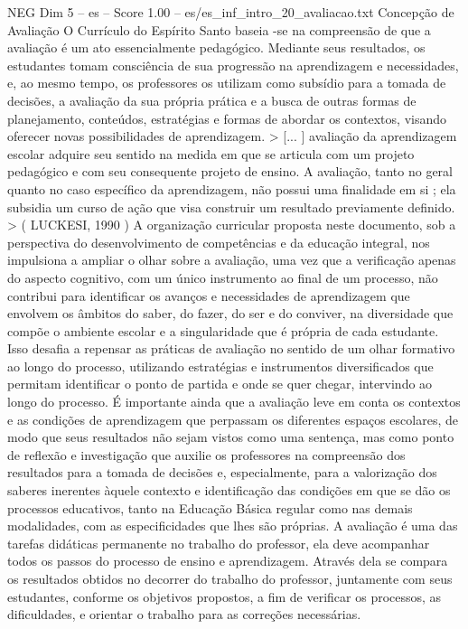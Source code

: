 \begin{textsample}{NEG Dim 5 – es – Score 1.00 – es/es\_inf\_intro\_20\_avaliacao.txt}  \label{ex:f5_neg_188}
Concepção de Avaliação O Currículo do Espírito Santo baseia -se na compreensão de que a avaliação é um ato essencialmente pedagógico.
Mediante seus resultados, os estudantes tomam consciência de sua progressão na aprendizagem e necessidades, e, ao mesmo tempo, os professores os utilizam como subsídio para a tomada de decisões, a avaliação da sua própria prática e a busca de outras formas de planejamento, conteúdos, estratégias e formas de abordar os contextos, visando oferecer novas possibilidades de aprendizagem. > [... ] avaliação da aprendizagem escolar adquire seu sentido na medida em que se articula com um projeto pedagógico e com seu consequente projeto de ensino.
A avaliação, tanto no geral quanto no caso específico da aprendizagem, não possui uma finalidade em si ; ela subsidia um curso de ação que visa construir um resultado previamente definido. > ( LUCKESI, 1990 ) A organização curricular proposta neste documento, sob a perspectiva do desenvolvimento de competências e da educação integral, nos impulsiona a ampliar o olhar sobre a avaliação, uma vez que a verificação apenas do aspecto cognitivo, com um único instrumento ao final de um processo, não contribui para identificar os avanços e necessidades de aprendizagem que envolvem os âmbitos do saber, do fazer, do ser e do conviver, na diversidade que compõe o ambiente escolar e a singularidade que é própria de cada estudante.
Isso desafia a repensar as práticas de avaliação no sentido de um olhar formativo ao longo do processo, utilizando estratégias e instrumentos diversificados que permitam identificar o ponto de partida e onde se quer chegar, intervindo ao longo do processo.
É importante ainda que a avaliação leve em conta os contextos e as condições de aprendizagem que perpassam os diferentes espaços escolares, de modo que seus resultados não sejam vistos como uma sentença, mas como ponto de reflexão e investigação que auxilie os professores na compreensão dos resultados para a tomada de decisões e, especialmente, para a valorização dos saberes inerentes àquele contexto e identificação das condições em que se dão os processos educativos, tanto na Educação Básica regular como nas demais modalidades, com as especificidades que lhes são próprias.
A avaliação é uma das tarefas didáticas permanente no trabalho do professor, ela deve acompanhar todos os passos do processo de ensino e aprendizagem.
Através dela se compara os resultados obtidos no decorrer do trabalho do professor, juntamente com seus estudantes, conforme os objetivos propostos, a fim de verificar os processos, as dificuldades, e orientar o trabalho para as correções necessárias.

\end{textsample}
